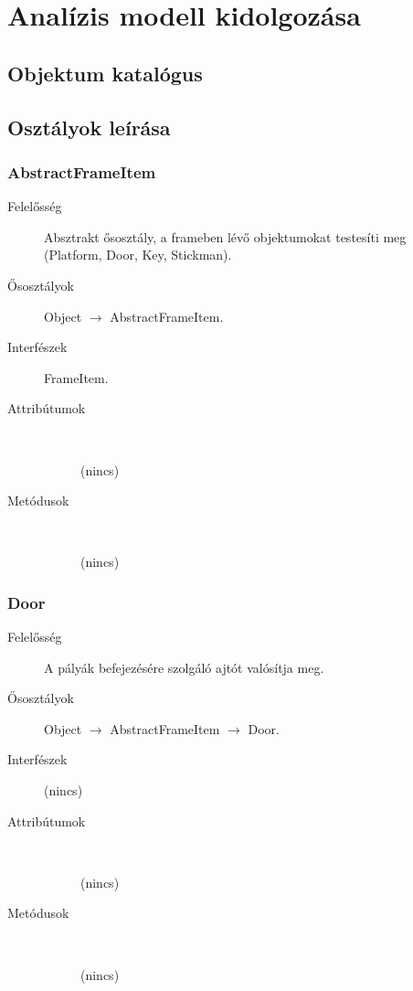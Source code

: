 



\fedlap

\addtocounter{section}{2}
\section{Analízis modell kidolgozása}

	\subsection{Objektum katalógus}
	
	\subsection{Osztályok leírása}
	
		\subsubsection{AbstractFrameItem}
		\begin{description}
		\item[Felelősség]
		Absztrakt ősosztály, a frameben lévő objektumokat testesíti meg (Platform, Door, Key, Stickman).
		\item[Ősosztályok] Object $\rightarrow{}$ AbstractFrameItem.
		\item[Interfészek] FrameItem.
		\item[Attribútumok]$\ $
		\begin{description}
		\item[] (nincs)
		\end{description}
		\item[Metódusok]$\ $
		\begin{description}
		\item[] (nincs)
		\end{description}
		\end{description}
		
		\subsubsection{Door}
		\begin{description}
		\item[Felelősség]
		A pályák befejezésére szolgáló ajtót valósítja meg.
		\item[Ősosztályok] Object $\rightarrow{}$ AbstractFrameItem $\rightarrow{}$ Door.
		\item[Interfészek] (nincs)
		\item[Attribútumok]$\ $
		\begin{description}
		\item[] (nincs)
		\end{description}
		\item[Metódusok]$\ $
		\begin{description}
		\item[] (nincs)
		\end{description}
		\end{description}
		
